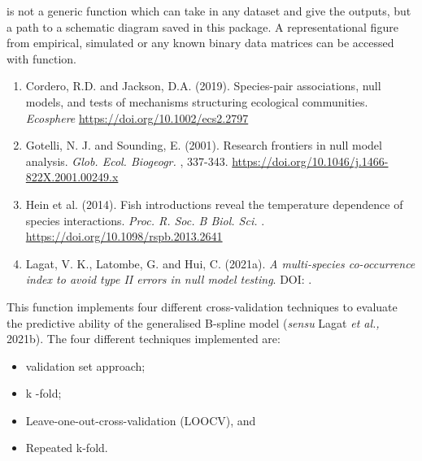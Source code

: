 \documentclass[a4paper]{book}
\begin{document}
%
\begin{Note}\relax
{} is not a generic function which can take in any dataset and give the outputs,
but a path to a schematic diagram saved in this package. A representational figure from empirical,
simulated or any known  binary data matrices can be accessed with  function.
\end{Note}
%
\begin{References}\relax
\begin{enumerate}


\item{} Cordero, R.D. and Jackson, D.A. (2019). Species-pair associations, null models, and tests of
mechanisms structuring ecological communities. \emph{Ecosphere}  \url{https://doi.org/10.1002/ecs2.2797}

\item{} Gotelli, N. J. and Sounding, E. (2001). Research frontiers in null model analysis. \emph{Glob. Ecol.
Biogeogr.} , 337-343. \url{https://doi.org/10.1046/j.1466-822X.2001.00249.x}

\item{} Hein et al. (2014). Fish introductions reveal the temperature
dependence of species interactions. \emph{Proc. R. Soc. B Biol. Sci.} .
\url{https://doi.org/10.1098/rspb.2013.2641}

\item{} Lagat, V. K., Latombe, G. and Hui, C. (2021a). \emph{A multi-species co-occurrence index to
avoid type II errors in null model testing}. DOI: .

\end{enumerate}

\end{References}
%
\begin{Description}\relax
This function implements four different cross-validation techniques to evaluate the
predictive ability of the generalised B-spline model (\emph{sensu} Lagat \emph{et al.,} 2021b).
The four different techniques implemented are:
\begin{itemize}

\item{} validation set approach;
\item{} k -fold;
\item{} Leave-one-out-cross-validation (LOOCV), and
\item{} Repeated k-fold.

\end{itemize}

\end{Description}
\end{document}
